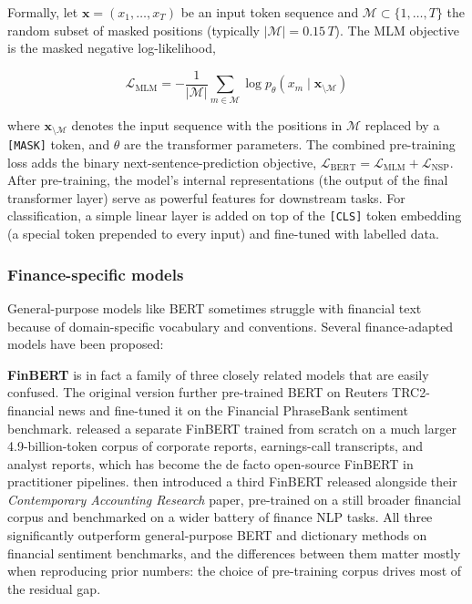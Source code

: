 Formally, let $\mathbf{x} = (x_1, \ldots, x_T)$ be an input token sequence and $\mathcal{M} \subset \{1, \ldots, T\}$ the random subset of masked positions (typically $|\mathcal{M}| = 0.15\, T$). The MLM objective is the masked negative log-likelihood,

\begin{equation}
\mathcal{L}_{\text{MLM}} = -\frac{1}{|\mathcal{M}|}\sum_{m \in \mathcal{M}} \log p_\theta(x_m \mid \mathbf{x}_{\setminus \mathcal{M}})
\tag{22.7}
\end{equation}

where $\mathbf{x}_{\setminus \mathcal{M}}$ denotes the input sequence with the positions in $\mathcal{M}$ replaced by a \texttt{[MASK]} token, and $\theta$ are the transformer parameters. The combined pre-training loss adds the binary next-sentence-prediction objective, $\mathcal{L}_{\text{BERT}} = \mathcal{L}_{\text{MLM}} + \mathcal{L}_{\text{NSP}}$. After pre-training, the model's internal representations (the output of the final transformer layer) serve as powerful features for downstream tasks. For classification, a simple linear layer is added on top of the \texttt{[CLS]} token embedding (a special token prepended to every input) and fine-tuned with labelled data.

\subsubsection{Finance-specific models}

General-purpose models like BERT sometimes struggle with financial text because of domain-specific vocabulary and conventions. Several finance-adapted models have been proposed:

\textbf{FinBERT} is in fact a family of three closely related models that are easily confused. The original \cite{araci2019finbert} version further pre-trained BERT on Reuters TRC2-financial news and fine-tuned it on the Financial PhraseBank sentiment benchmark. \cite{yang2020finbert} released a separate FinBERT trained from scratch on a much larger 4.9-billion-token corpus of corporate reports, earnings-call transcripts, and analyst reports, which has become the de facto open-source FinBERT in practitioner pipelines. \cite{huang2023finbert} then introduced a third FinBERT released alongside their \textit{Contemporary Accounting Research} paper, pre-trained on a still broader financial corpus and benchmarked on a wider battery of finance NLP tasks. All three significantly outperform general-purpose BERT and dictionary methods on financial sentiment benchmarks, and the differences between them matter mostly when reproducing prior numbers: the choice of pre-training corpus drives most of the residual gap.

